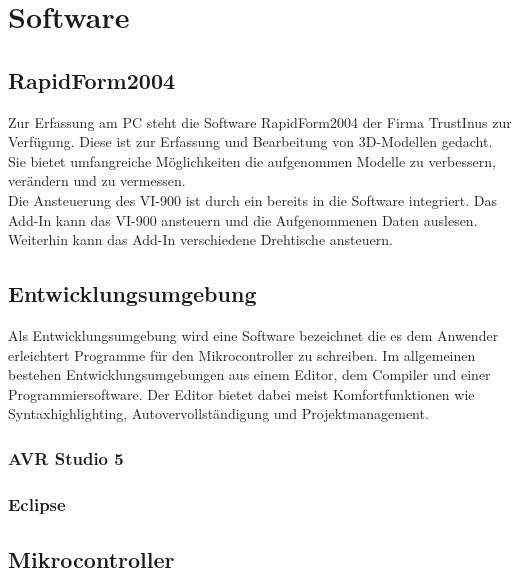 \chapter{Software}
\label{cha:Software}

\section{RapidForm2004}
\label{sec:RapidForm}
Zur Erfassung am PC steht die Software RapidForm2004 der Firma TrustInus zur Verfügung. Diese ist zur Erfassung und Bearbeitung von 3D-Modellen gedacht. Sie bietet umfangreiche Möglichkeiten die aufgenommen Modelle zu verbessern, verändern und zu vermessen.\\
Die Ansteuerung des VI-900 ist durch ein  bereits in die Software integriert. Das Add-In kann das VI-900 ansteuern und die Aufgenommenen Daten auslesen. Weiterhin kann das Add-In verschiedene Drehtische ansteuern.

\section{Entwicklungsumgebung}
Als Entwicklungsumgebung wird eine Software bezeichnet die es dem Anwender erleichtert Programme für den Mikrocontroller zu schreiben. Im allgemeinen bestehen Entwicklungsumgebungen aus einem Editor, dem Compiler und einer Programmiersoftware. Der Editor bietet dabei meist Komfortfunktionen wie Syntaxhighlighting, Autovervollständigung und Projektmanagement.  
\subsection{AVR Studio 5}
\subsection{Eclipse}

\section{Mikrocontroller}
